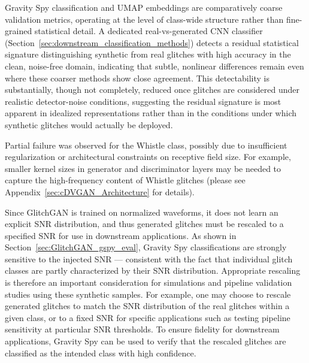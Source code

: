 \documentclass[reprint,nofootinbib,amsmath,amssymb,aps,floatfix]{revtex4-2}
\begin{document}
Gravity Spy classification and UMAP embeddings are comparatively coarse validation metrics, operating at the level of class-wide structure rather than fine-grained statistical detail. A dedicated real-vs-generated CNN classifier (Section~\ref{sec:downstream_classification_methods}) detects a residual statistical signature distinguishing synthetic from real glitches with high accuracy in the clean, noise-free domain, indicating that subtle, nonlinear differences remain even where these coarser methods show close agreement. This detectability is substantially, though not completely, reduced once glitches are considered under realistic detector-noise conditions, suggesting the residual signature is most apparent in idealized representations rather than in the conditions under which synthetic glitches would actually be deployed.

Partial failure was observed for the Whistle class, possibly due to insufficient regularization or architectural constraints on receptive field size. 
For example, smaller kernel sizes in generator and discriminator  layers may be needed to capture the high-frequency content of Whistle glitches (please see Appendix~\ref{sec:cDVGAN_Architecture} for details).

Since GlitchGAN is trained on normalized waveforms, it does not learn an explicit SNR distribution, and thus generated glitches must be rescaled to a specified SNR for use in downstream applications. 
As shown in Section~\ref{sec:GlitchGAN_gspy_eval}, Gravity Spy classifications are strongly sensitive to the injected SNR --- consistent with the fact that individual glitch classes are partly characterized by their SNR distribution.
Appropriate rescaling is therefore an important consideration for simulations and pipeline validation studies using these synthetic samples.
For example, one may choose to rescale generated glitches to match the SNR distribution of the real glitches within a given class, or to a fixed SNR for specific applications such as testing pipeline sensitivity at particular SNR thresholds.
To ensure fidelity for downstream applications, Gravity Spy can be used to verify that the rescaled glitches are classified as the intended class with high confidence.
\end{document}

